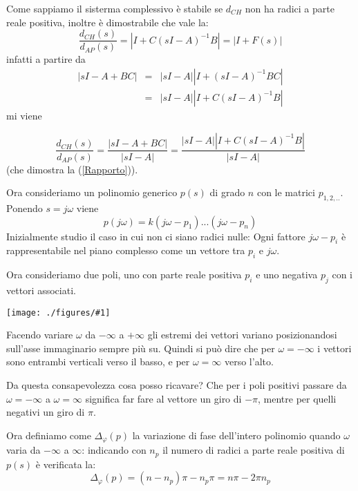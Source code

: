 \documentclass{article}
\newcommand{\incfig}[2]{%
	\texttt{[image: ./figures/\#1]}%
}
\begin{document}
Come sappiamo il sisterma complessivo è stabile se $d_{CH}$ non ha radici a parte reale positiva,
inoltre è dimostrabile che vale la:
\begin{equation}\label{Rapporto}
  \frac{d_{CH}(s)}{d_{AP}(s)} =   |I +C(sI - A)^{-1}B| = |I+F(s)|
\end{equation}
infatti a partire da 
\begin{align*}
    |sI-A+BC| &=& |sI-A||I +(sI - A)^{-1}BC|\\
                &=&|sI-A||I +C(sI - A)^{-1}B|
\end{align*}
mi viene

\[
    \frac{d_{CH}(s)}{d_{AP}(s)}    = \frac{|sI-A+BC|}{|sI-A|} = \frac{|sI-A||I +C(sI - A)^{-1}B|}{|sI-A|}
\]
(che dimostra la (\ref{Rapporto})).

Ora consideriamo un polinomio generico $p(s)$ di grado $n$ con le matrici $p_{1,2,..}$.
Ponendo $s = j\omega$ viene 
\[ 
    p(j\omega) = {k(j\omega-p_1)...(j\omega - p_n)}
\]
Inizialmente studio il caso in cui non ci siano radici nulle:
Ogni fattore $j\omega - p_i$ è rappresentabile nel piano complesso come un vettore tra $p_i$ e $j\omega$.

Ora consideriamo due poli, uno con parte reale positiva $p_i$ e uno negativa $p_j$  con i vettori associati.

\incfig{pipj.jpeg}{0.5}

Facendo variare $\omega$ da $-\infty$ a $+\infty$ gli estremi dei vettori variano posizionandosi
sull'asse immaginario sempre più su. Quindi si può dire che per $\omega=-\infty$ i vettori sono entrambi verticali verso il basso,
e per $\omega=\infty$ verso l'alto.

Da questa consapevolezza cosa posso ricavare? Che per i poli positivi passare da $\omega=-\infty$ a $\omega=\infty$
significa far fare al vettore un giro di $-\pi$, mentre per quelli negativi un giro di $\pi$.

Ora definiamo come $\Delta_{\varphi}(p)$ la variazione di fase dell'intero polinomio
quando $\omega$ varia da $-\infty$ a $\infty$: indicando con $n_p$ il numero di radici a parte reale positiva di $p(s)$
è verificata la:
\begin{equation}\label{varphi}
    \Delta_{\varphi}(p) = (n-n_p)\pi-n_p\pi=n\pi-2\pi n_p
\end{equation}
\end{document}
